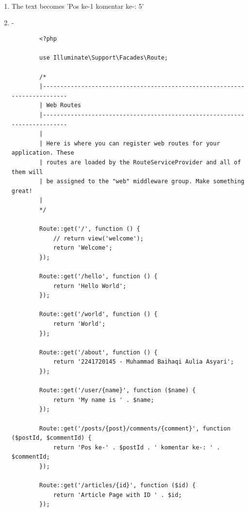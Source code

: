 \documentclass[12pt,titlepage]{article}
\begin{document}
\begin{enumerate}[label=\alph*.]
\begin{verbatim}
        Route::get('/', function () {
            // return view('welcome');
            return 'Welcome';
        });
        
        Route::get('/hello', function () {
            return 'Hello World';
        });
        
        Route::get('/world', function () {
            return 'World';
        }); 
        
        Route::get('/about', function () {
            return '2241720145 - Muhammad Baihaqi Aulia Asyari';
        }); 
        
        Route::get('/user/{name}', function ($name) {
            return 'My name is ' . $name;
        }); 
        
        Route::get('/posts/{post}/comments/{comment}', function ($postId, $commentId) {
            return 'Pos ke-' . $postId . ' komentar ke-:' . $commentId;
        });        
    \end{verbatim}
    \item The text becomes 'Pos ke-1 komentar ke-: 5'
    \item -
    \begin{verbatim}
        <?php

        use Illuminate\Support\Facades\Route;
        
        /*
        |--------------------------------------------------------------------------
        | Web Routes
        |--------------------------------------------------------------------------
        |
        | Here is where you can register web routes for your application. These
        | routes are loaded by the RouteServiceProvider and all of them will
        | be assigned to the "web" middleware group. Make something great!
        |
        */
        
        Route::get('/', function () {
            // return view('welcome');
            return 'Welcome';
        });
        
        Route::get('/hello', function () {
            return 'Hello World';
        });
        
        Route::get('/world', function () {
            return 'World';
        }); 
        
        Route::get('/about', function () {
            return '2241720145 - Muhammad Baihaqi Aulia Asyari';
        }); 
        
        Route::get('/user/{name}', function ($name) {
            return 'My name is ' . $name;
        }); 
        
        Route::get('/posts/{post}/comments/{comment}', function ($postId, $commentId) {
            return 'Pos ke-' . $postId . ' komentar ke-: ' . $commentId;
        });
        
        Route::get('/articles/{id}', function ($id) {
            return 'Article Page with ID ' . $id;
        });        
    \end{verbatim}
\end{enumerate}
\end{document}
